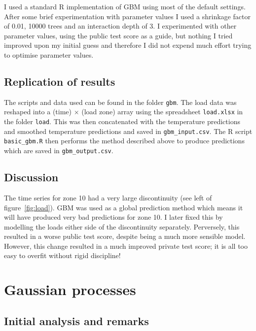 I used a standard R implementation of GBM using most of the default settings\footnotemark{}.
After some brief experimentation with parameter values I used a shrinkage factor of 0.01, 10000 trees and an interaction depth of 3.
I experimented with other parameter values, using the public test score as a guide, but nothing I tried improved upon my initial guess and therefore I did not expend much effort trying to optimise parameter values.


\subsection{Replication of results}

The scripts and data used can be found in the folder \texttt{gbm}.
The load data was reshaped into a (time) $\times$ (load zone) array using the spreadsheet \texttt{load.xlsx} in the folder \texttt{load}.
This was then concatenated with the temperature predictions and smoothed temperature predictions and saved in \texttt{gbm\_input.csv}.
The R script \texttt{basic\_gbm.R} then performs the method described above to produce predictions which are saved in \texttt{gbm\_output.csv}.

\subsection{Discussion}

The time series for zone 10 had a very large discontinuity (see left of figure~\ref{fig:load}).
GBM was used as a global prediction method which means it will have produced very bad predictions for zone 10.
I later fixed this by modelling the loads either side of the discontinuity separately.
Perversely, this resulted in a worse public test score, despite being a much more sensible model.
However, this change resulted in a much improved private test score; it is all too easy to overfit without rigid discipline!

\section{Gaussian processes}

\label{sec:gp}

\subsection{Initial analysis and remarks}

